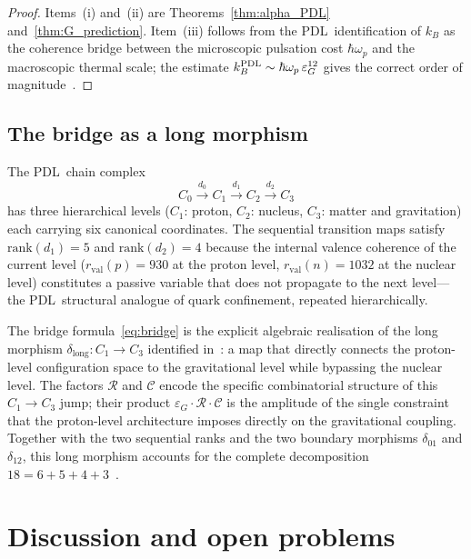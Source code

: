 \documentclass[11pt,a4paper]{article}
\theoremstyle{definition}
\newcommand{\PDL}{\textnormal{PDL}}
\newcommand{\rval}{r_{\mathrm{val}}}
\newcommand{\epsg}{\varepsilon_G}
\newcommand{\calR}{\mathcal{R}}
\newcommand{\calC}{\mathcal{C}}
\begin{document}
\begin{proof}
  Items~(i) and~(ii) are Theorems~\ref{thm:alpha_PDL} and~\ref{thm:G_prediction}. Item~(iii) follows from the \PDL\ identification of $k_B$ as the coherence bridge between the microscopic pulsation cost $\hbar\omega_p$ and the macroscopic thermal scale; the estimate $k_B^{\PDL} \sim \hbar\omega_p\,
  \epsg^{12}$ gives the correct order of magnitude~\cite{PDL_Main_2026}.
\end{proof}

\subsection{The bridge as a long morphism}
\label{subsec:long_morphism}

The \PDL\ chain complex~\cite{Topology_18_PDL_2026}
\[
  C_0 \xrightarrow{d_0} C_1 \xrightarrow{d_1} C_2 \xrightarrow{d_2} C_3
\]
has three hierarchical levels ($C_1$: proton, $C_2$: nucleus, $C_3$: matter and gravitation) each carrying six canonical coordinates. The sequential transition maps satisfy $\mathrm{rank}(d_1) = 5$ and $\mathrm{rank}(d_2) = 4$ because the internal valence coherence of the current level ($\rval(p) = 930$ at the proton level, $\rval(n) = 1032$ at the nuclear level) constitutes a passive variable that does not propagate to the next level---the \PDL\ structural analogue of quark confinement, repeated hierarchically.

The bridge formula~\eqref{eq:bridge} is the explicit algebraic realisation of the long morphism $\delta_{\mathrm{long}} : C_1 \to C_3$ identified in~\cite{Topology_18_PDL_2026}: a map that directly connects the proton-level configuration space to the gravitational level while bypassing the nuclear level. The factors $\calR$ and $\calC$ encode the specific combinatorial structure of this $C_1 \to C_3$ jump; their product $\epsg \cdot \calR \cdot \calC$ is the amplitude of the single constraint that the proton-level architecture imposes directly on the gravitational coupling. Together with the two sequential ranks and the two boundary morphisms $\delta_{01}$ and $\delta_{12}$, this long morphism accounts for the complete decomposition $18 = 6 + 5 + 4 + 3$~\cite{Topology_18_PDL_2026}.

\section{Discussion and open problems}
\label{sec:discussion}
\end{document}
